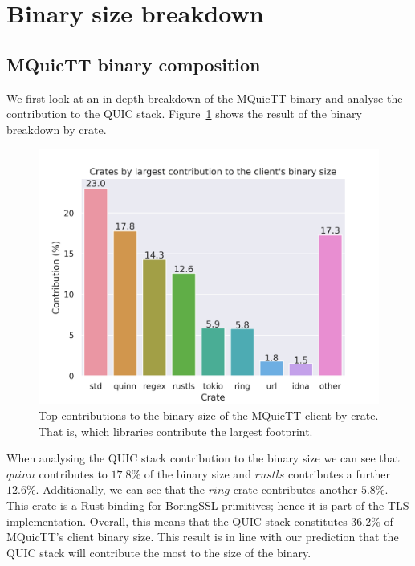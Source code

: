 \section{Binary size breakdown} \label{sec:binary_sizes}

\subsection{MQuicTT binary composition}

We first look at an in-depth breakdown of the MQuicTT binary and analyse the contribution to the QUIC stack.
Figure~\ref{fig:mquictt_client_bin} shows the result of the binary breakdown by crate.

\begin{figure}[ht]
    \centering
    \includegraphics[width=1\linewidth]{images/mquictt_binary_client.png}
    \caption{Top contributions to the binary size of the MQuicTT client by crate. That is, which libraries contribute the largest footprint.}
    \label{fig:mquictt_client_bin}
\end{figure}

When analysing the QUIC stack contribution to the binary size we can see that $quinn$ contributes to $17.8\%$ of the binary size and $rustls$ contributes a further $12.6\%$.
Additionally, we can see that the $ring$ crate contributes another $5.8\%$.
This crate is a Rust binding for BoringSSL primitives; hence it is part of the TLS implementation.
Overall, this means that the QUIC stack constitutes $36.2\%$ of MQuicTT's client binary size.
This result is in line with our prediction that the QUIC stack will contribute the most to the size of the binary.

